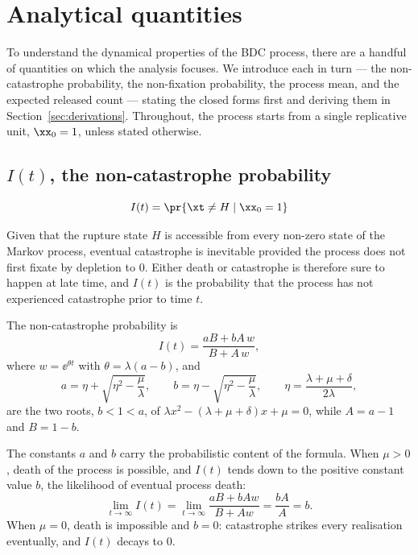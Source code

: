 \section{Analytical quantities}
\label{sec:analytical}

To understand the dynamical properties of the BDC process, there are a handful
of quantities on which the analysis focuses. We introduce each in turn --- the
non-catastrophe probability, the non-fixation probability, the process mean,
and the expected released count --- stating the closed forms first and deriving
them in Section~\ref{sec:derivations}. Throughout, the process starts from a
single replicative unit, $\xx_0=1$, unless stated otherwise.

\subsection{$I(t)$, the non-catastrophe probability}

\vspace{3pt}
{\Large$$ I(t) = \pr{\xt \neq H\;|\; \xx_0 = 1}$$}

\noindent
Given that the rupture state $H$ is accessible from every non-zero state of the
Markov process, eventual catastrophe is inevitable provided the process does not
first fixate by depletion to $0$. Either death or catastrophe is therefore sure
to happen at late time, and $I(t)$ is the probability that the process has not
experienced catastrophe prior to time $t$.

\begin{theorem}
\label{thm:I}
The non-catastrophe probability is
\begin{equation}
\label{eq:Iclosedform}
I(t) = \frac{aB + bA\,w}{B + A\,w},
\end{equation}
where $w=\ee^{\theta t}$ with $\theta=\lambda(a-b)$, and
\begin{equation*}
a = \eta+\sqrt{\eta^2-\frac{\mu}{\lambda}}, \qquad
b = \eta-\sqrt{\eta^2-\frac{\mu}{\lambda}}, \qquad
\eta = \frac{\lambda + \mu + \delta}{2\lambda},
\end{equation*}
are the two roots, $b<1<a$, of $\lambda x^2-(\lambda+\mu+\delta)x+\mu=0$, while
$A=a-1$ and $B=1-b$.
\end{theorem}

The constants $a$ and $b$ carry the probabilistic content of the formula.
When $\mu>0$, death of the process is possible, and $I(t)$ tends down to the
positive constant value $b$, the likelihood of eventual process death:
$$\lim_{t\to \infty}I(t) = \lim_{t\to\infty}\frac{aB + bAw}{B + Aw} = \frac{bA}{A} = b.$$
When $\mu=0$, death is impossible and $b=0$: catastrophe strikes every
realisation eventually, and $I(t)$ decays to $0$.

